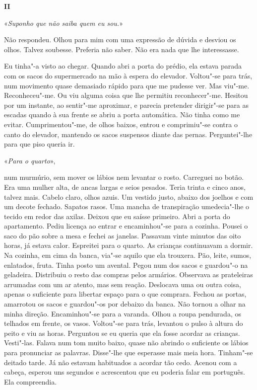\vspace*{1.8cm}
\noindent{}\textbf{II}

\bigskip

«\emph{Suponho que não saiba quem eu sou.}»

Não respondeu. Olhou para mim com uma expressão de dúvida e desviou os
olhos. Talvez soubesse. Preferia não saber. Não era nada que lhe
interessasse.

Eu tinha"-a visto ao chegar. Quando abri a porta do prédio, ela estava
parada com os sacos do supermercado na mão à espera do elevador.
Voltou"-se para trás, num movimento quase demasiado rápido para que me
pudesse ver. Mas viu"-me. Reconheceu"-me. Ou viu alguma coisa que lhe
permitiu reconhecer"-me. Hesitou por um instante, ao sentir"-me
aproximar, e parecia pretender dirigir"-se para as escadas quando à sua
frente se abriu a porta automática. Não tinha como me evitar.
Cumprimentou"-me, de olhos baixos, entrou e comprimiu"-se contra o canto
do elevador, mantendo os sacos suspensos diante das pernas.
Perguntei"-lhe para que piso queria ir.

«\emph{Para o quarto}»,

num murmúrio, sem mover os lábios nem levantar o rosto. Carreguei no
botão. Era uma mulher alta, de ancas largas e seios pesados. Teria
trinta e cinco anos, talvez mais. Cabelo claro, olhos azuis. Um vestido
justo, abaixo dos joelhos e com um decote fechado. Sapatos rasos. Uma
mancha de transpiração umedecia"-lhe o tecido em redor das axilas.
Deixou que eu saísse primeiro. Abri a porta do apartamento. Pediu
licença ao entrar e encaminhou"-se para a cozinha. Pousei o saco do pão
sobre a mesa e fechei as janelas. Passavam vinte minutos das oito horas,
já estava calor. Espreitei para o quarto. As crianças continuavam a
dormir. Na cozinha, em cima da banca, via"-se aquilo que ela trouxera.
Pão, leite, sumos, enlatados, fruta. Tinha posto um avental. Pegou num
dos sacos e guardou"-o na geladeira. Distribuiu o resto das compras
pelos armários. Observava as prateleiras arrumadas com um ar atento, mas
sem reação. Deslocava uma ou outra coisa, apenas o suficiente para
libertar espaço para o que comprara. Fechou as portas, amarrotou os
sacos e guardou"-os por debaixo da banca. Não tornou a olhar na minha
direção. Encaminhou"-se para a varanda. Olhou a roupa pendurada, os
telhados em frente, os vasos. Voltou"-se para trás, levantou o pulso à
altura do peito e viu as horas. Perguntou se eu queria que ela fosse
acordar as crianças. Vesti"-las. Falava num tom muito baixo, quase não
abrindo o suficiente os lábios para pronunciar as palavras. Disse"-lhe
que esperasse mais meia hora. Tinham"-se deitado tarde. Já não estavam
habituados a acordar tão cedo. Acenou com a cabeça, esperou uns segundos
e acrescentou que eu poderia falar em português. Ela compreendia.

